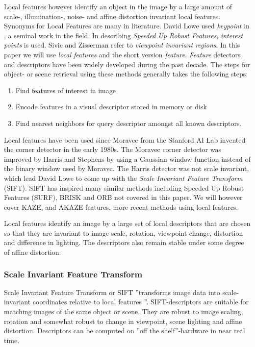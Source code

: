 \documentclass[english,12pt,a4paper,pdftex,elec,utf8, table]{aaltothesis}
\begin{document}
Local features however identify an object in the image by a large amount of scale-, illumination-, noise- and affine distortion invariant local features. Synonyms for Local Features are many in literature. David Lowe used \emph{keypoint} in \cite{Lowe2004}, a seminal work in the field. In describing \emph{Speeded Up Robust Features}, \emph{interest points} is used. Sivic and Zisserman refer to \emph{viewpoint invariant regions}. In this paper we will use \emph{local features} and the short version \emph{feature}. \emph{Feature} detectors and descriptors have been widely developed during the past decade. The steps for object- or scene retrieval using these methods generally takes the following steps:

\begin{enumerate}
\item Find features of interest in image
\item Encode features in a visual descriptor stored in memory or disk
\item Find nearest neighbors for query descriptor amongst all known descriptors.
\end{enumerate}

Local features have been used since Moravec \cite{Moravec1981} from the Stanford AI Lab invented the corner detector in the early 1980s. The Moravec corner detector was improved by Harris and Stephens \cite{Harris1988} by using a Gaussian window function instead of the binary window used by Moravec. The Harris detector was not scale invariant, which lead David Lowe to come up with the \emph{Scale Invariant Feature Transform} (SIFT). SIFT has inspired many similar methods including Speeded Up Robust Features (SURF), BRISK and ORB not covered in this paper. We will however cover KAZE, and AKAZE features, more recent methods using local features.

Local features identify an image by a large set of local descriptors that are chosen so that they are invariant to image scale, rotation, viewpoint change, distortion and difference in lighting. The descriptors also remain stable under some degree of affine distortion. \cite{Lowe2004}

\subsubsection{Scale Invariant Feature Transform} \label{SIFTSection}
Scale Invariant Feature Transform or SIFT ''transforms image data into scale-invariant coordinates relative to local features \cite{Lowe2004}''. SIFT-descriptors are suitable for matching images of the same object or scene. They are robust to image scaling, rotation and somewhat robust to change in viewpoint, scene lighting and affine distortion. Descriptors can be computed on ''off the shelf''-hardware in near real time. \cite{Lowe2004}
\end{document}

